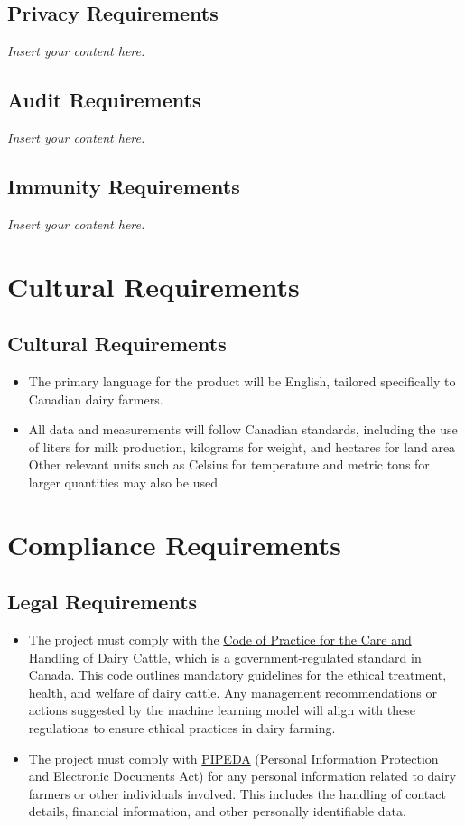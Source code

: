\documentclass[12pt]{article}
\newcommand{\lips}{\textit{Insert your content here.}}
\begin{document}
\subsection{Privacy Requirements}
\lips
\subsection{Audit Requirements}
\lips
\subsection{Immunity Requirements}
\lips

\section{Cultural Requirements}
\subsection{Cultural Requirements}
\begin{itemize}
	\item The primary language for the product will be English, tailored
	      specifically to Canadian dairy farmers. 
	\item All data and measurements will follow Canadian standards, including the
	      use of liters for milk production, kilograms for weight, and hectares
	      for land area Other relevant units such as Celsius for temperature and
	      metric tons for larger quantities may also be used
\end{itemize}

\section{Compliance Requirements}
\subsection{Legal Requirements}
\begin{itemize}
	\item The project must comply with the
	      \href{https://www.nfacc.ca/codes-of-practice/dairy-cattle}{Code of
	      Practice for the Care and Handling of Dairy Cattle}, which is a
	      government-regulated standard in Canada. This code outlines mandatory
	      guidelines for the ethical treatment, health, and welfare of dairy
	      cattle. Any management recommendations or actions suggested by the
	      machine learning model will align with these regulations to ensure
	      ethical practices in dairy farming.
	        
	\item The project must comply with
	      \href{https://laws-lois.justice.gc.ca/pdf/p-8.6.pdf}{PIPEDA} (Personal
	      Information Protection and Electronic Documents Act) for any personal
	      information related to dairy farmers or other individuals involved. This
	      includes the handling of contact details, financial information, and
	      other personally identifiable data.
\end{itemize}
\end{document}
